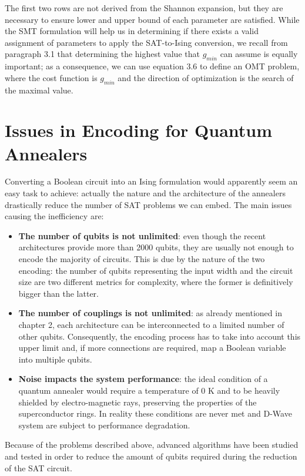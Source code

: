 The first two rows are not derived from the Shannon expansion, but they are necessary to ensure lower and upper bound of each parameter are satisfied. While the SMT formulation will help us in determining if there exists a valid assignment of parameters to apply the SAT-to-Ising conversion, we recall from paragraph 3.1 that determining the highest value that $g_{min}$ can assume is equally important; as a consequence, we can use equation 3.6 to define an OMT problem, where the cost function is $g_{min}$ and the direction of optimization is the search of the maximal value.

\section{Issues in Encoding for Quantum Annealers}

Converting a Boolean circuit into an Ising formulation would apparently seem an easy task to achieve: actually the nature and the architecture of the annealers drastically reduce the number of SAT problems we can embed. The main issues causing the inefficiency are:

\begin{itemize}
    \item \textbf{The number of qubits is not unlimited}: even though the recent architectures provide more than 2000 qubits, they are usually not enough to encode the majority of circuits.
    This is due by the nature of the two encoding: the number of qubits representing the input width and the circuit size are two different metrics for complexity, where the former is definitively bigger than the latter. 
    \item \textbf{The number of couplings is not unlimited}: as already mentioned in chapter 2, each architecture can be interconnected to a limited number of other qubits. Consequently, the encoding process has to take into account this upper limit and, if more connections are required, map a Boolean variable into multiple qubits.
    \item \textbf{Noise impacts the system performance}: the ideal condition of a quantum annealer would require a temperature of 0 K and to be heavily shielded by electro-magnetic rays, preserving the properties of the superconductor rings. In reality these conditions are never met and D-Wave system are subject to performance degradation.
\end{itemize}

Because of the problems described above, advanced algorithms have been studied and tested in order to reduce the amount of qubits required during the reduction of the SAT circuit.


